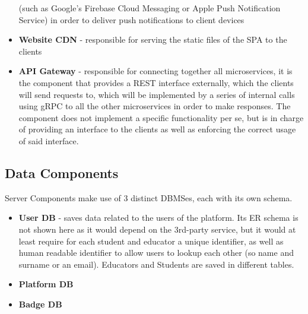 \begin{itemize}
          (such as Google's Firebase Cloud Messaging or Apple Push Notification Service) in order to deliver push notifications
          to client devices
    \item \textbf{Website CDN} {-} responsible for serving the static files of the SPA to the clients
    \item \textbf{API Gateway} {-} responsible for connecting together all microservices, it is the component that provides a REST
          interface externally, which the clients will send requests to, which will be implemented by a series of internal calls
          using gRPC \cite{gRPC} to all the other microservices in order to make responses. The component does not implement a specific
          functionality per se, but is in charge of providing an interface to the clients as well as enforcing the correct usage
          of said interface.
\end{itemize}

\subsection{Data Components}
Server Components make use of 3 distinct DBMSes, each with its own schema.
\begin{itemize}
    \item \textbf{User DB} {-} saves data related to the users of the platform. Its ER schema is not shown
          here as it would depend on the 3rd-party service, but it would at least require for each student and
          educator a unique identifier, as well as human readable identifier to allow users to lookup each other
          (so name and surname or an email). Educators and Students are saved in different tables.
          \pagebreak
    \item \textbf{Platform DB}
          \begin{adjustbox}{
                  max size={\textwidth}{},
                  caption={Platform ER},
                  label={fig:Platform ER},
                  figure=H}
              \centering
          \end{adjustbox}
          \pagebreak
    \item \textbf{Badge DB}
          \begin{adjustbox}{
                  max size={\textwidth}{},
                  caption={Badges ER},
                  label={fig:Badges ER},
                  figure=H}
              \centering
          \end{adjustbox}
\end{itemize}
\pagebreak

